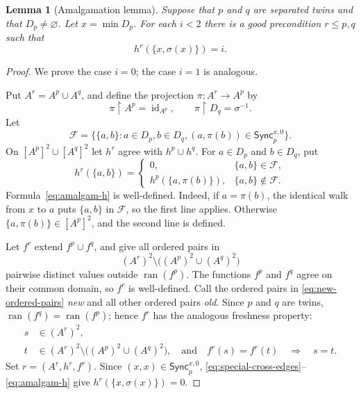 \documentclass{amsart}
\numberwithin{equation}{section}
\newtheorem{lemma}[theorem]{Lemma}
\theoremstyle{definition}
\theoremstyle{remark}
\newcommand{\restr}{\mathbin{\upharpoonright}}
\begin{document}
\begin{lemma}[Amalgamation lemma]\label{lem:amalgamation}
Suppose that $p$ and $q$ are separated twins and that $D_p\ne\varnothing$.
Let $x=\min D_p$.  For each $i<2$ there is a good precondition
$r\leq p,q$ such that
\begin{displaymath}
 h^r(\{x,\sigma(x)\})=i.
\end{displaymath}
\end{lemma}

\begin{proof}
We prove the case $i=0$; the case $i=1$ is analogous.

Put $A^r=A^p\cup A^q$, and define the projection $\pi:A^r\to A^p$ by
\begin{displaymath}
 \pi\restr A^p=\operatorname{id}_{A^p},
 \qquad \pi\restr D_q=\sigma^{-1}.
\end{displaymath}
Let
\begin{equation}\label{eq:special-cross-edges}
 \mathcal F=
 \bigl\{\{a,b\}:a\in D_p, b\in D_q,
        (a,\pi(b))\in\mathsf{Sync}^{x,0}_p\bigr\}.
\end{equation}
On $[A^p]^2\cup[A^q]^2$ let $h^r$ agree with $h^p\cup h^q$.
For $a\in D_p$ and $b\in D_q$, put
\begin{equation}\label{eq:amalgam-h}
 h^r(\{a,b\})=
 \begin{cases}
 0,&\{a,b\}\in\mathcal F,\\
 h^p(\{a,\pi(b)\}),&\{a,b\}\notin\mathcal F.
 \end{cases}
\end{equation}
Formula~\eqref{eq:amalgam-h} is well-defined.  Indeed, if $a=\pi(b)$,
the identical
walk from $x$ to $a$ puts $\{a,b\}$ in $\mathcal F$, so the first line
applies.  Otherwise $\{a,\pi(b)\}\in[A^p]^2$, and the second line is
defined.

Let $f^r$ extend $f^p\cup f^q$, and give all ordered pairs in
\begin{equation}\label{eq:new-ordered-pairs}
 (A^r)^2\setminus\bigl((A^p)^2\cup(A^q)^2\bigr)
\end{equation}
pairwise distinct values outside $\operatorname{ran}(f^p)$.
The functions $f^p$ and $f^q$ agree on their common domain, so $f^r$ is
well-defined.  Call the ordered pairs in
\eqref{eq:new-ordered-pairs} \emph{new} and all other
ordered pairs \emph{old}.  Since $p$ and $q$ are twins,
$\operatorname{ran}(f^q)=\operatorname{ran}(f^p)$; hence $f^r$ has the
analogous freshness property:
\begin{displaymath}
 \begin{aligned}
 s&\in(A^r)^2,\\
 t&\in(A^r)^2\setminus\bigl((A^p)^2\cup(A^q)^2\bigr),
 \quad\text{and}\quad f^r(s)=f^r(t)
 \quad\Longrightarrow\quad s=t.
 \end{aligned}                                           \tag{$F_r$}
\end{displaymath}
Set $r=(A^r,h^r,f^r)$.  Since
$(x,x)\in\mathsf{Sync}^{x,0}_p$,
\eqref{eq:special-cross-edges}--\eqref{eq:amalgam-h} give
$h^r(\{x,\sigma(x)\})=0$.


\end{proof}
\end{document}
